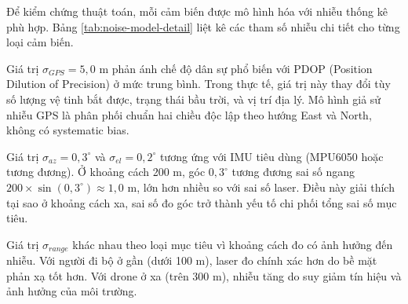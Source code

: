 \hspace{0.5cm} Để kiểm chứng thuật toán, mỗi cảm biến được mô hình hóa với nhiễu thống kê phù hợp. Bảng \ref{tab:noise-model-detail} liệt kê các tham số nhiễu chi tiết cho từng loại cảm biến.

\begin{table}[H]
\centering
\caption{Tham số mô hình nhiễu cảm biến}
\label{tab:noise-model-detail}
\end{table}

Giá trị $\sigma_{GPS} = 5{,}0$ m phản ánh chế độ dân sự phổ biến với PDOP (Position Dilution of Precision) ở mức trung bình. Trong thực tế, giá trị này thay đổi tùy số lượng vệ tinh bắt được, trạng thái bầu trời, và vị trí địa lý. Mô hình giả sử nhiễu GPS là phân phối chuẩn hai chiều độc lập theo hướng East và North, không có systematic bias.

Giá trị $\sigma_{az} = 0{,}3^\circ{}$ và $\sigma_{el} = 0{,}2^\circ{}$ tương ứng với IMU tiêu dùng (MPU6050 hoặc tương đương). Ở khoảng cách 200 m, góc $0{,}3^\circ{}$ tương đương sai số ngang $200 \times \sin(0{,}3^\circ{}) \approx 1{,}0$ m, lớn hơn nhiều so với sai số laser. Điều này giải thích tại sao ở khoảng cách xa, sai số đo góc trở thành yếu tố chi phối tổng sai số mục tiêu.

Giá trị $\sigma_{range}$ khác nhau theo loại mục tiêu vì khoảng cách đo có ảnh hưởng đến nhiễu. Với người đi bộ ở gần (dưới 100 m), laser đo chính xác hơn do bề mặt phản xạ tốt hơn. Với drone ở xa (trên 300 m), nhiễu tăng do suy giảm tín hiệu và ảnh hưởng của môi trường.

